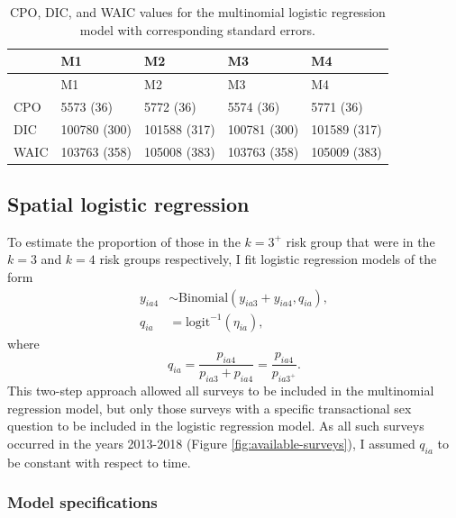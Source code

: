 \documentclass[a4paper, nobind]{templates/ociamthesis}
\begin{document}
\begin{longtable}[]{@{}lllll@{}}
\caption{\label{tab:model-comparison} CPO, DIC, and WAIC values for the multinomial logistic regression model with corresponding standard errors.}\tabularnewline
\toprule\noalign{}
& M1 & M2 & M3 & M4 \\
\midrule\noalign{}
\endfirsthead
\toprule\noalign{}
& M1 & M2 & M3 & M4 \\
\midrule\noalign{}
\endhead
\bottomrule\noalign{}
\endlastfoot
CPO & 5573 (36) & 5772 (36) & 5574 (36) & 5771 (36) \\
DIC & 100780 (300) & 101588 (317) & 100781 (300) & 101589 (317) \\
WAIC & 103763 (358) & 105008 (383) & 103763 (358) & 105009 (383) \\
\end{longtable}

\hypertarget{s-logistic}{%
\subsection{Spatial logistic regression}\label{s-logistic}}

To estimate the proportion of those in the \(k = 3^{+}\) risk group that were in the \(k = 3\) and \(k = 4\) risk groups respectively, I fit logistic regression models of the form
\begin{align}
    y_{ia4} &\sim \text{Binomial} \left( y_{ia3} + y_{ia4}, q_{ia} \right), \label{eq:logistic-regression} \\
    q_{ia} &= \text{logit}^{-1} \left( \eta_{ia} \right), 
\end{align}
where
\begin{equation}
q_{ia} = \frac{p_{ia4}}{p_{ia3} + p_{ia4}} = \frac{p_{ia4}}{p_{ia{3^+}}}.
\end{equation}
This two-step approach allowed all surveys to be included in the multinomial regression model, but only those surveys with a specific transactional sex question to be included in the logistic regression model.
As all such surveys occurred in the years 2013-2018 (Figure \ref{fig:available-surveys}), I assumed \(q_{ia}\) to be constant with respect to time.

\hypertarget{model-specifications-1}{%
\subsubsection{Model specifications}\label{model-specifications-1}}
\end{document}
